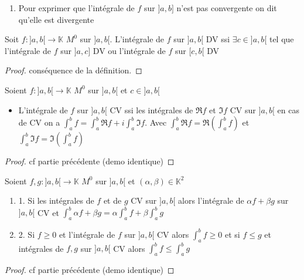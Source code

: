 \documentclass[11pt,hidelinks]{book}
\theoremstyle{mytheoremstyle}
\theoremstyle{mytheoremstyle}
\theoremstyle{mytheoremstyle}
\theoremstyle{mytheoremstyle}
\theoremstyle{mytheoremstyle}
\theoremstyle{mytheoremstyle}
\theoremstyle{mytheoremstyle}
\theoremstyle{mytheoremstyle}
\theoremstyle{myproblemstyle}
\def\mbb#1{\mathbb{#1}}
\def\ib#1{\int_{a}^{b} #1}
\def\bK{\mbb{K}}
\def\abc{]a,b]}
\def\abd{]a,b[}
\newcommand{\func}[3]{#1\colon#2\to#3}
\newcommand{\parenth}[1]{\left(#1\right)}
\begin{document}
\begin{adjustwidth}{-2em}{-1em}
\begin{definition}
\begin{enumerate}
            \item Pour exprimer que l'intégrale de $f$ sur $\abc$ n'est pas convergente on dit qu'elle est 
            divergente 
            \end{enumerate}
        
        \end{definition}
        \begin{prop}
            Soit $\func{f}{\abd}{\bK}$ $M^0$ sur $]a,b[$. L'intégrale 
            de $f$ sur $\abd$ DV ssi $\exists c \in \abd$ tel que l'intégrale de 
            $f$ sur $]a,c]$ DV ou l'intégrale de $f$ sur $[c,b[$ DV
            \begin{proof}
                conséquence de la définition.
            \end{proof}
        \end{prop}
        \begin{prop}
            Soient $\func{f}{\abd}{\bK}$ $M^0$ sur $\abd$ et $c \in \abd$ 
            \begin{itemize}
            \item L'intégrale de $f$ sur $\abd$ CV ssi les intégrales de $\Re f$ et $\Im f$ CV sur $\abd$ 
            en cas de CV on a $\ib{f} = \ib{\Re f} + i \ib{\Im f}$. Avec $\ib{\Re f} = \Re \parenth{\ib{f}}$ et $\ib{\Im f} = \Im \parenth{\ib{f}}$
            \end{itemize}
            \begin{proof}
                cf partie précédente (demo identique)
            \end{proof}
        \end{prop}
        \begin{prop}
            Soient $\func{f,g}{\abd}{\bK}$ $M^0$ sur $\abd$ et $(\alpha, \beta) \in \bK^2$ 
            \begin{enumerate} 
            \item 1. Si les intégrales de $f$ et de $g$ CV sur $\abd$ alors l'intégrale de $\alpha f + \beta g$ sur $\abd$
            CV et $\ib{\alpha f + \beta g} = \alpha \ib{f} + \beta \ib{g}$
            \item 2. Si $f \geq 0$ et l'intégrale de $f$ sur $\abd$ CV alors $\ib{f} \geq 0$
            et si $f \leq g$ et intégrales de $f,g$ sur $\abd$ CV alors $\ib{f} \leq \ib{g}$
            \end{enumerate}
            \begin{proof}
                cf partie précédente (demo identique)
            \end{proof}
        \end{prop}
        

\end{adjustwidth}
\end{document}
